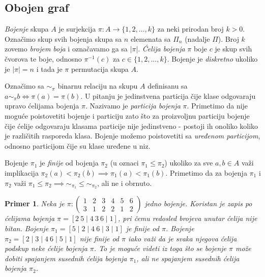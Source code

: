 \documentclass[12pt,oneside]{memoir}
\newtheorem{example}{Primer}
\theoremstyle{definition}
\begin{document}
  \subsection{Obojen graf}

   \emph{Bojenje} skupa $A$ je surjekcija $\pi : A \to \{1, 2, \dots, k\}$ za
   neki prirodan broj $k > 0$. Označimo skup svih bojenja skupa sa $n$
   elemenata sa $\Pi_n$ (nadalje $\Pi$).  Broj $k$ zovemo \emph{brojem boja} i
   označavamo ga sa $|\pi|$.  \emph{Ćelija bojenja} $\pi$ boje $c$ je skup svih
   čvorova te boje, odnosno $\pi^{-1}(c)$ za $c \in \{1, 2, ..., k\}$.  Bojenje
   je \emph{diskretno} ukoliko je $|\pi| = n$ i tada je $\pi$ permutacija skupa
   $A$.

   Označimo sa $\sim_\pi$ binarnu relaciju na skupu $A$ definisanu sa $a
   \sim_\pi b \iff \pi(a) = \pi(b)$. U pitanju je jedinstvena particija čije
   klase odgovaraju upravo ćelijama bojenja $\pi$. Nazivamo je \emph{particija
   bojenja} $\pi$. Primetimo da nije moguće poistovetiti bojenje i particiju
   zato što za proizvoljnu particiju bojenje čije ćelije odgovaraju klasama
   particije nije jedinstveno - postoji ih onoliko koliko je različitih
   rasporeda klasa.  Bojenje možemo poistovetiti sa \emph{uređenom particijom},
   odnosno particijom čije su klase uređene u niz.

   Bojenje $\pi_1$ je \emph{finije} od bojenja $\pi_2$ (u oznaci $\pi_1 \leq \pi_2$)
   ukoliko za sve $a, b \in A$ važi implikacija $\pi_2(a) < \pi_2(b) \implies
   \pi_1(a) < \pi_1(b)$.  Primetimo da za bojenja $\pi_1$ i $\pi_2$ važi $\pi_1
   \leq \pi_2 \implies {\sim_{\pi_1}} \leq {\sim_{\pi_2}}$, ali ne i obrnuto.

   \begin{example}
	   Neka je $\pi :
	   \begin{pmatrix}
		   1 & 2 & 3 & 4 & 5 & 6 \\
		   3 & 1 & 2 & 2 & 1 & 2
	   \end{pmatrix}$
	   jedno bojenje. Koristan je zapis po ćelijama bojenja $\pi = [2\ 5 \mid
	   4\ 3\ 6 \mid 1]$, pri čemu redosled brojeva unutar ćelija nije bitan.
	   Bojenje $\pi_1 = [5 \mid 2 \mid 4\ 6 \mid 3 \mid 1]$ je finije od $\pi$.
	   Bojenje $\pi_2 = [2 \mid 3 \mid 4\ 6 \mid 5 \mid 1]$ nije finije od
	   $\pi$ iako važi da je svaka njegova ćelija podskup neke ćelije bojenja
	   $\pi$. To je moguće videti iz toga što se bojenje $\pi$ može dobiti
	   spajanjem susednih ćelija bojenja $\pi_1$, ali ne spajanjem susednih
	   ćelija bojenja $\pi_2$.
   \end{example}
\end{document}
